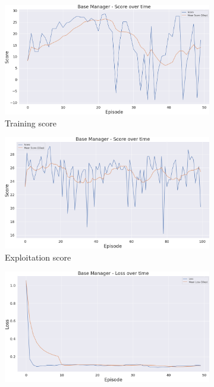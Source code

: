 \begin{figure}[h]
    \centering
    \begin{subfigure}[b]{0.495\textwidth}
        \includegraphics[width=1\textwidth]{figs/multi_dqn_base_manager/score.png}
        \caption{Training score}
    \end{subfigure}
    \begin{subfigure}[b]{0.495\textwidth}
        \includegraphics[width=1\textwidth]{figs/multi_dqn_base_manager/exploit/score.png}
        \caption{Exploitation score}
    \end{subfigure}
    \begin{subfigure}[b]{0.495\textwidth}
        \includegraphics[width=1\textwidth]{figs/multi_dqn_base_manager/loss.png}

\end{subfigure}
\end{figure}
